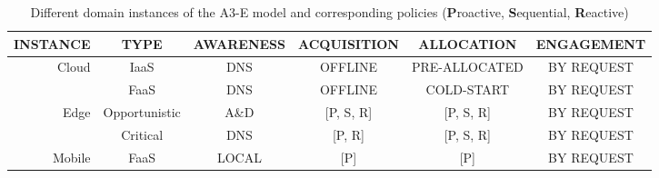 %
%
%
%
%
%
%



\begin{center}
\begin{table}[htbp]
\small
\caption{Different domain instances of the A3-E model and  corresponding policies (\textbf{P}roactive, \textbf{S}equential, \textbf{R}eactive)}\label{tab:A3-E-instances}
\begin{tabular}{ r c c c c c }
\toprule

INSTANCE & TYPE & \textbf{A}WARENESS & \textbf{A}CQUISITION	& \textbf{A}LLOCATION 	& \textbf{E}NGAGEMENT  	\\

\midrule

\multirow{2}{*}{ Cloud }
& IaaS	& DNS	& OFFLINE		& PRE-ALLOCATED	& BY REQUEST\\
& FaaS		& DNS	& OFFLINE		& COLD-START	& BY REQUEST\\\midrule					
\multirow{2}{*}{ Edge }
& Opportunistic		& A\&D	& [P, S, R]		& [P, S, R]		& BY REQUEST\\	
& Critical		& DNS	& [P, R]		& [P, S, R] 	& BY REQUEST\\\midrule					
\multirow{1}{*}{ Mobile }
& FaaS	& LOCAL  & [P]		& [P] 	& BY REQUEST\\

\bottomrule
\end{tabular}
\end{table}
\end{center}
\normalsize

